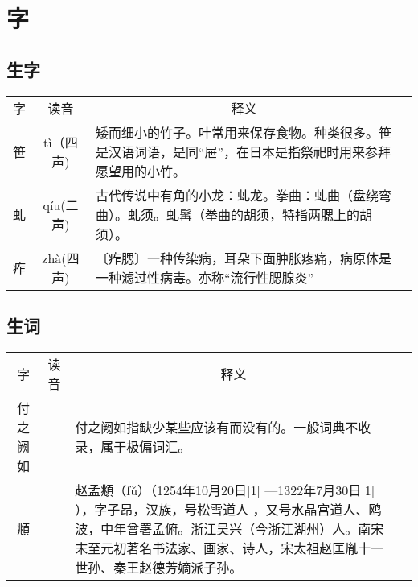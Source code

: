 \documentclass[letter]{book}
\begin{document}
\section*{字}



\subsection*{生字}


\begin{tabular}{ccp{8cm}c}
	\hline
	\multirow{1}{*}{字}
	& \multicolumn{1}{c}{读音} 
	& \multicolumn{1}{c}{释义}\\			
		笹    & t\`{i}（四声)       & 矮而细小的竹子。叶常用来保存食物。种类很多。笹是汉语词语，是同“屉”，在日本是指祭祀时用来参拜愿望用的小竹。           \\
	虬 & q\'{i}u(二声)  &古代传说中有角的小龙：虬龙。拳曲：虬曲（盘绕弯曲）。虬须。虬髯（拳曲的胡须，特指两腮上的胡须）。\\
	痄 & zh\`{a}(四声) &  〔痄腮〕一种传染病，耳朵下面肿胀疼痛，病原体是一种滤过性病毒。亦称“流行性腮腺炎” \\
	\hline
\end{tabular}



\subsection{生词}

\begin{tabular}{ccp{8cm}c}
	\hline
	\multirow{1}{*}{字}
	& \multicolumn{1}{c}{读音} 
	& \multicolumn{1}{c}{释义}\\			
	付之阙如    &       & 付之阙如指缺少某些应该有而没有的。一般词典不收录，属于极偏词汇。         \\
	\hline
	頫 & & 赵孟頫（fǔ）（1254年10月20日[1]  —1322年7月30日[1]  ），字子昂，汉族，号松雪道人 ，又号水晶宫道人、鸥波，中年曾署孟俯。浙江吴兴（今浙江湖州）人。南宋末至元初著名书法家、画家、诗人，宋太祖赵匡胤十一世孙、秦王赵德芳嫡派子孙。\\
\end{tabular}
\end{document}
